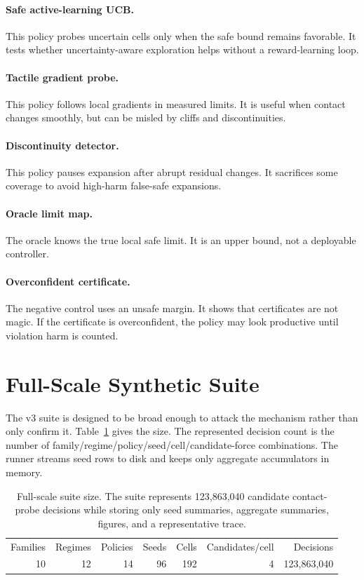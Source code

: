 \documentclass{article}
\begin{document}
\paragraph{Safe active-learning UCB.}
This policy probes uncertain cells only when the safe bound remains favorable.
It tests whether uncertainty-aware exploration helps without a reward-learning
loop.

\paragraph{Tactile gradient probe.}
This policy follows local gradients in measured limits. It is useful when
contact changes smoothly, but can be misled by cliffs and discontinuities.

\paragraph{Discontinuity detector.}
This policy pauses expansion after abrupt residual changes. It sacrifices some
coverage to avoid high-harm false-safe expansions.

\paragraph{Oracle limit map.}
The oracle knows the true local safe limit. It is an upper bound, not a
deployable controller.

\paragraph{Overconfident certificate.}
The negative control uses an unsafe margin. It shows that certificates are not
magic. If the certificate is overconfident, the policy may look productive
until violation harm is counted.

\section{Full-Scale Synthetic Suite}

The v3 suite is designed to be broad enough to attack the mechanism rather than
only confirm it. Table~\ref{tab:scale} gives the size. The represented decision
count is the number of family/regime/policy/seed/cell/candidate-force
combinations. The runner streams seed rows to disk and keeps only aggregate
accumulators in memory.

\begin{table}[h]
\centering
\small
\begin{tabular}{rrrrrrr}
\hline
Families & Regimes & Policies & Seeds & Cells & Candidates/cell & Decisions \\
10 & 12 & 14 & 96 & 192 & 4 & 123,863,040 \\
\end{tabular}
\caption{Full-scale suite size. The suite represents 123,863,040 candidate
contact-probe decisions while storing only seed summaries, aggregate summaries,
figures, and a representative trace.}
\label{tab:scale}
\end{table}
\end{document}
